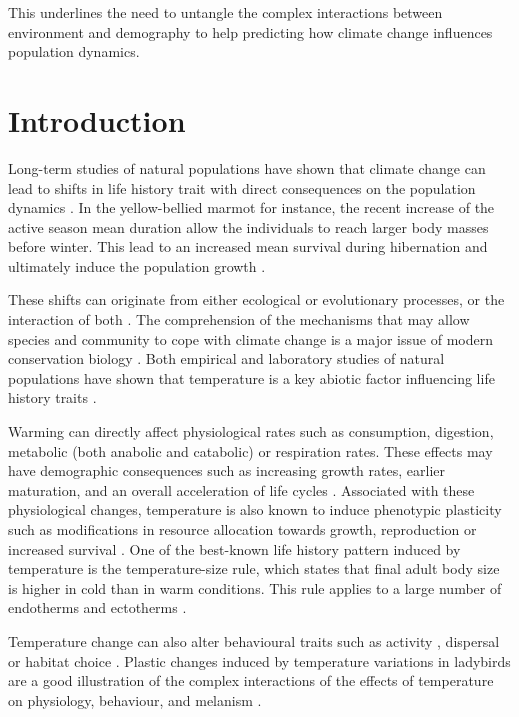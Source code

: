 This underlines the need to untangle the complex interactions between
environment and demography to help predicting how climate change influences
population dynamics.


\section{Introduction}

Long-term studies of natural populations have shown that climate change can lead
to shifts in life history trait with direct consequences on the population
dynamics \autocites{parmesan2006a,ozgul2009a,ozgul2010coupled}.
In the yellow-bellied marmot for instance, the recent increase of the active season mean duration allow the
individuals to reach larger body masses before winter. This lead to an increased
mean survival during hibernation and ultimately induce the population growth
\autocites{ozgul2010coupled}.

These shifts can originate from either ecological or evolutionary processes, or
the interaction of both
\autocites{ozgul2009a,pelletier2007evolutionary,kokko2007a,saccheri2006natural}.
The comprehension of the mechanisms that may allow species and community to cope
with climate change is a major issue of modern conservation biology
\autocites{lavergne2010a}. Both empirical and laboratory studies of
natural populations \autocites{edeline2013a,atkinson1996a}
have shown that temperature is a key abiotic factor influencing life history
traits \autocites{gillooly2001a}.

Warming can directly affect physiological rates such as consumption, digestion,
metabolic (both anabolic and catabolic) or respiration rates. These effects may
have demographic consequences such as increasing growth rates, earlier
maturation, and an overall acceleration of life cycles
\autocites{gillooly2002a,le-galliard2012a}. Associated with these physiological
changes, temperature is also known to induce phenotypic plasticity such as
modifications in resource allocation towards growth, reproduction or increased
survival
\autocites{liefting2010temperature,hallsson2012selection,gutteling2007mapping}.
One of the best-known life history pattern induced by temperature is the
temperature-size rule, which states that final adult body size is higher in cold
than in warm conditions.
This rule applies to a large number of endotherms and ectotherms
\autocites{atkinson1994a,atkinson1996a,angilletta2009a,walters2006temperature,daufresne2009global}.

Temperature change can also alter behavioural traits such as activity
\autocites{atacho2013a,seebacher2005review}, dispersal
\autocites{bonte2008thermal} or habitat choice
\autocites{vanbeest2012temperature}. Plastic changes induced by temperature
variations in ladybirds are a good illustration of the complex interactions of
the effects of temperature on physiology, behaviour, and melanism
\autocites{michie2010melanic}.

